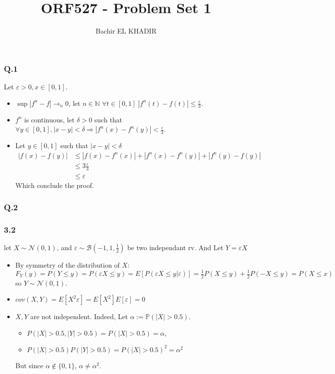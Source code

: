 \documentclass[12pt]{article}
\title{ORF527 - Problem Set 1}
\author{Bachir EL KHADIR }
\newcommand{\Q}[1]{\subsubsection*{Q.#1}}
\begin{document}
\maketitle
\Q{1}

Let $\varepsilon > 0, x \in [0, 1]$.

\begin{itemize}
\item $\sup |f^n - f| \rightarrow_n 0$, let $n \in \mathbb N$
  $\forall t \in [0, 1] \; |f^n(t) - f(t)| \le \frac{\varepsilon}3$.

\item $f^n$ is continuous, let $\delta > 0$ such that
  $\forall y \in [0, 1], |x-y| < \delta \Rightarrow |f^n(x) - f^n(y)|
  < \frac{\varepsilon}3$.  
\item
  Let $y \in [0, 1]$ such that $|x - y| < \delta$
  \begin{align*}
    |f(x) - f(y)|
    & \le |f(x) - f^n(x)| + |f^n(x) - f^n(y)| + |f^n(y) - f(y)|
    \\&\le 3 \frac{\varepsilon}3
    \\&\le \varepsilon 
  \end{align*}
  Which conclude the proof.
\end{itemize}

\Q{2}
\subsubsection*{3.2}

let $X \sim \mathcal N(0,1)$, and $\varepsilon \sim \mathcal B(-1, 1, \frac1 2)$ be two independant rv. And Let $Y = \varepsilon X$
\begin{itemize}
\item By symmetry of the distribution of $X$:
$F_Y(y) = P(Y \leq y) = P(\varepsilon X \leq y) = E[ P(\varepsilon X \leq y | \varepsilon) ] = \frac1 2 P(X \leq y) + \frac1 2 P(- X \leq y) = P(X \leq x)$
so $Y \sim \mathcal N(0, 1)$.

\item $cov(X, Y) = E[X^2 \varepsilon] = E[X^2]E[\varepsilon] = 0$
\item  $X, Y$ are not independent. Indeed, Let $\alpha := \mathbb P(|X| > 0.5)$.
  \begin{itemize}
  \item $P(|X| > 0.5, |Y| > 0.5) = P(|X| > 0.5) = \alpha$,
  \item $P(|X| > 0.5) P(|Y| > 0.5) = P(|X| > 0.5)^2 = \alpha^2$
  \end{itemize}
  But since $\alpha \not \in \{0, 1\}$, $\alpha \ne \alpha^2$.
\end{itemize}
\end{document}
